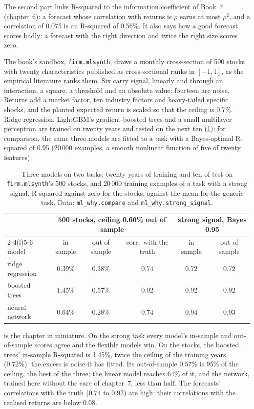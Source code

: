 The second part links R-squared to the information coefficient of Book~7 (chapter~6): a forecast whose correlation
with returns is $\rho$ earns at most $\rho^2$, and a correlation of 0.075 is an R-squared of 0.56\%. It also says how a
good forecast scores badly: a forecast with the right direction and twice the right size scores zero.

The book's sandbox, \texttt{firm.mlsynth}, draws a monthly cross-section of 500 stocks with twenty characteristics
published as cross-sectional ranks in $[-1, 1]$, as the empirical literature ranks them. Six carry signal, linearly and
through an interaction, a square, a threshold and an absolute value; fourteen are noise. Returns add a market factor,
ten industry factors and heavy-tailed specific shocks, and the planted expected return is scaled so that the ceiling
is 0.7\%. Ridge regression, LightGBM's gradient-boosted trees and a small multilayer perceptron are trained on twenty
years and tested on the next ten (\cref{tab:ml:why:models}); for comparison, the same three models are fitted to a task
with a Bayes-optimal R-squared of 0.95 (20\,000 examples, a smooth nonlinear function of five of twenty features).

\begin{table}[htbp]
\centering\small
\begin{tabular}{@{}lccccc@{}}
\toprule
 & \multicolumn{3}{c}{500 stocks, ceiling 0.60\% out of sample} & \multicolumn{2}{c}{strong signal, Bayes 0.95}\\
\cmidrule(lr){2-4}\cmidrule(l){5-6}
model & in sample & out of sample & corr.\ with the truth & in sample & out of sample\\
\midrule
ridge regression & 0.39\% & 0.38\% & 0.74 & 0.72 & 0.72\\
boosted trees & 1.45\% & 0.57\% & 0.92 & 0.92 & 0.92\\
neural network & 0.64\% & 0.28\% & 0.74 & 0.94 & 0.93\\
\bottomrule
\end{tabular}
\caption{Three models on two tasks: twenty years of training and ten of test on \texttt{firm.mlsynth}'s 500 stocks,
and 20\,000 training examples of a task with a strong signal. R-squared against zero for the stocks, against the mean for
the generic task. Data: \texttt{ml\_why.compare} and \texttt{ml\_why.strong\_signal}.}\label{tab:ml:why:models}
\end{table}

 is the chapter in miniature. On the strong task every model's in-sample and out-of-sample scores
agree and the flexible models win. On the stocks, the boosted trees' in-sample R-squared is 1.45\%, twice the ceiling
of the training years (0.72\%): the excess is noise it has fitted. Its out-of-sample 0.57\% is 95\% of the ceiling, the
best of the three; the linear model reaches 64\% of it, and the network, trained here without the care of
chapter~7, less than half. The forecasts' correlations with the truth
(0.74 to 0.92) are high; their correlations with the realised returns are below 0.08.

